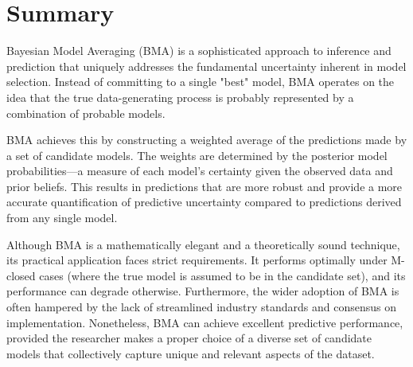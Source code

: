 \documentclass[12 pt]{scrartcl}
\begin{document}
	
	
	\section{Summary}
	
	Bayesian Model Averaging (BMA) is a sophisticated approach to inference and prediction that uniquely addresses the fundamental uncertainty inherent in model selection. Instead of committing to a single "best" model, BMA operates on the idea that the true data-generating process is probably represented by a combination of probable models.
	
	BMA achieves this by constructing a weighted average of the predictions made by a set of candidate models. The weights are determined by the posterior model probabilities—a measure of each model's certainty given the observed data and prior beliefs. This results in predictions that are more robust and provide a more accurate quantification of predictive uncertainty compared to predictions derived from any single model.
	
	Although BMA is a mathematically elegant and a theoretically sound technique, its practical application faces strict requirements. It performs optimally under M-closed cases (where the true model is assumed to be in the candidate set), and its performance can degrade otherwise. Furthermore, the wider adoption of BMA is often hampered by the lack of streamlined industry standards and consensus on implementation. Nonetheless, BMA can achieve excellent predictive performance, provided the researcher makes a proper choice of a diverse set of candidate models that collectively capture unique and relevant aspects of the dataset.
	
	\newpage
	\renewcommand\refname{Bibliography} 
	
	
	
	
\end{document}
